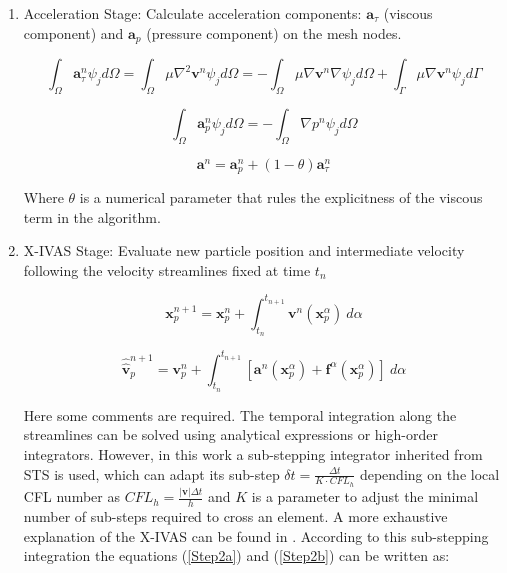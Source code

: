 \begin{enumerate}
  \item Acceleration Stage: Calculate acceleration components: $\mathbf{a}_{\tau}$ (viscous component) and $\mathbf{a}_{p}$ (pressure component) on the mesh nodes.


  \begin{equation}\label{Step1a}
\int_{\Omega}\mathbf{a}^{n}_{\tau}\psi_j d\Omega=\int_{\Omega}\mu \nabla^{2}\mathbf{v}^{n} \psi_j d\Omega=-\int_{\Omega}\mu \nabla\mathbf{v}^{n} \nabla \psi_j d\Omega + \int_{\Gamma}\mu \nabla\mathbf{v}^{n} \psi_j d\Gamma
\end{equation}

\begin{equation}\label{Step1b}
\int_{\Omega}\mathbf{a}^{n}_{p}\psi_j d\Omega=-\int_{\Omega}\nabla p^{n} \psi_j d\Omega
\end{equation}

\begin{equation}\label{Step1c}
\mathbf{a}^{n}=\mathbf{a}^{n}_{p} + (1-\theta)\mathbf{a}^{n}_{\tau}
\end{equation}

Where $\theta$ is a numerical parameter that rules the explicitness of the viscous term in the algorithm.

  \item X-IVAS Stage: Evaluate new particle position and intermediate velocity following the velocity streamlines fixed at time $t_n$

  \begin{equation}\label{Step2a}
\mathbf{x}^{n+1}_{p}=\mathbf{x}^{n}_{p} + \int_{t_n}^{t_{n+1}} \mathbf{v}^{n}(\mathbf{x}_p^{\alpha}) \ d\alpha
\end{equation}

\begin{equation}\label{Step2b}
\displaystyle \widehat{\widehat{\mathbf{v}}}^{n+1}_{p}=\mathbf{v}^{n}_{p} +
\int_{t_n}^{t_{n+1}} \left[ \mathbf{a}^{n}(\mathbf{x}_p^{\alpha}) + \mathbf{f}^{\alpha} (\mathbf{x}_p^{\alpha}) \right]
 \ d\alpha
\end{equation}

Here some comments are required. The temporal integration along the streamlines can be solved using analytical expressions\cite{Idelsohn12} or high-order integrators\cite{Nair2003275}. However, in this work a sub-stepping integrator inherited from STS\cite{Alexiades96} is used, which can adapt its sub-step $\delta t=\frac{\Delta t}{K\cdot CFL_h}$ depending on the local CFL number as $CFL_h=\frac{|\mathbf{v}|\Delta t}{h}$ and $K$ is a parameter to adjust the minimal number of sub-steps required to cross an element. A more exhaustive explanation of the X-IVAS can be found in \cite{Nigro11}. According to this sub-stepping integration the equations (\ref{Step2a}) and (\ref{Step2b}) can be written as:


\end{enumerate}

